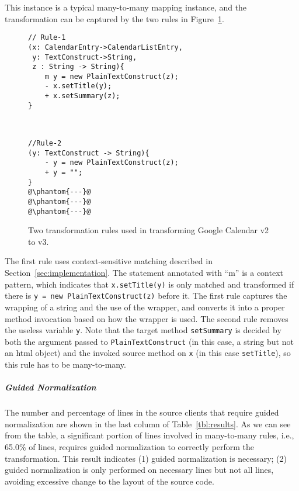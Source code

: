 \documentclass[a4paper, USenglish]{lipics-v2016}
\newenvironment{smpage}[1]
{\begin{lrbox}{\fmbox}\begin{minipage}{#1}}
{\end{minipage}\end{lrbox}\usebox{\fmbox}}
\newcommand{\code}[1]{\texttt{\footnotesize #1}}
\theoremstyle{plain}
\begin{document}
This instance is a typical many-to-many mapping instance, and the
transformation can be captured by the two rules in Figure~\ref{evelfig:gcalendar}.

\begin{figure}
\begin{center}
\begin{smpage}{0.42\columnwidth}
\begin{lstlisting}[style=patl,frame=none,numbers=none, basicstyle=\scriptsize\ttfamily]
// Rule-1
(x: CalendarEntry->CalendarListEntry, 
 y: TextConstruct->String, 
 z : String -> String){
    m y = new PlainTextConstruct(z);
    - x.setTitle(y);
    + x.setSummary(z);
}
\end{lstlisting}
\end{smpage}
~~~
\begin{smpage}{0.4\columnwidth}
\begin{lstlisting}[style=patl,frame=none,numbers=none, basicstyle=\scriptsize\ttfamily]
//Rule-2
(y: TextConstruct -> String){
    - y = new PlainTextConstruct(z);
    + y = "";
}
@\phantom{---}@
@\phantom{---}@
@\phantom{---}@
\end{lstlisting}
\end{smpage}
\end{center}
\vspace{-20pt}
\caption{Two transformation rules used in transforming Google Calendar v2 to v3.}
\label{evelfig:gcalendar}
\vspace{-15pt}
\end{figure}

The first rule uses context-sensitive matching described in
Section~\ref{sec:implementation}. The statement annotated with ``m'' is a
context pattern, which indicates that \code{x.setTitle(y)} is only
matched and transformed if there is \code{y = new
  PlainTextConstruct(z)} before it. The first rule
captures the wrapping of a string and the use of the
wrapper, and converts it into a proper method invocation based on how
the wrapper is used. The second rule removes the useless variable
\code{y}. Note that the target method \code{setSummary} is decided by
both the argument passed to \code{PlainTextConstruct} (in this case, a
string but not an html object) and the invoked source method on
\code{x} (in this case \code{setTitle}), so this rule has to be many-to-many.

\subparagraph*{Guided Normalization}
The number and percentage of lines in the source clients that require guided normalization
are shown in the last column of Table~\ref{tbl:results}. As we can see
from the table, a significant portion of lines involved in
many-to-many rules, i.e., 65.0\% of lines, requires guided
normalization to correctly perform the transformation. This result
indicates (1) guided normalization is necessary; (2) guided
normalization is only performed on necessary lines but not all lines,
avoiding excessive change to the layout of the source code. 
\end{document}
